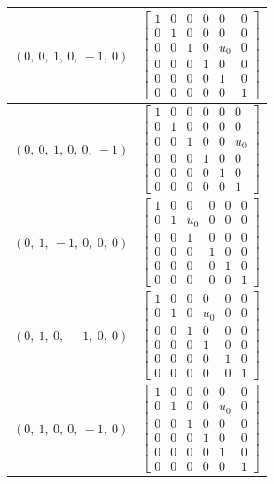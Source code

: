 \documentclass[11pt]{article}
\theoremstyle{definition}
\begin{document}
\begin{longtable}{|l|c|}
    \hline
    $\left( 0, \  0, \  1, \  0, \  -1, \  0\right)$ & ${\left[\begin{matrix}1 & 0 & 0 & 0 & 0 & 0\\0 & 1 & 0 & 0 & 0 & 0\\0 & 0 & 1 & 0 & u_{0} & 0\\0 & 0 & 0 & 1 & 0 & 0\\0 & 0 & 0 & 0 & 1 & 0\\0 & 0 & 0 & 0 & 0 & 1\end{matrix}\right]}$ \\
    \hline
    $\left( 0, \  0, \  1, \  0, \  0, \  -1\right)$ & ${\left[\begin{matrix}1 & 0 & 0 & 0 & 0 & 0\\0 & 1 & 0 & 0 & 0 & 0\\0 & 0 & 1 & 0 & 0 & u_{0}\\0 & 0 & 0 & 1 & 0 & 0\\0 & 0 & 0 & 0 & 1 & 0\\0 & 0 & 0 & 0 & 0 & 1\end{matrix}\right]}$ \\
    \hline
    $\left( 0, \  1, \  -1, \  0, \  0, \  0\right)$ & ${\left[\begin{matrix}1 & 0 & 0 & 0 & 0 & 0\\0 & 1 & u_{0} & 0 & 0 & 0\\0 & 0 & 1 & 0 & 0 & 0\\0 & 0 & 0 & 1 & 0 & 0\\0 & 0 & 0 & 0 & 1 & 0\\0 & 0 & 0 & 0 & 0 & 1\end{matrix}\right]}$ \\
    \hline
    $\left( 0, \  1, \  0, \  -1, \  0, \  0\right)$ & ${\left[\begin{matrix}1 & 0 & 0 & 0 & 0 & 0\\0 & 1 & 0 & u_{0} & 0 & 0\\0 & 0 & 1 & 0 & 0 & 0\\0 & 0 & 0 & 1 & 0 & 0\\0 & 0 & 0 & 0 & 1 & 0\\0 & 0 & 0 & 0 & 0 & 1\end{matrix}\right]}$ \\
    \hline
    $\left( 0, \  1, \  0, \  0, \  -1, \  0\right)$ & ${\left[\begin{matrix}1 & 0 & 0 & 0 & 0 & 0\\0 & 1 & 0 & 0 & u_{0} & 0\\0 & 0 & 1 & 0 & 0 & 0\\0 & 0 & 0 & 1 & 0 & 0\\0 & 0 & 0 & 0 & 1 & 0\\0 & 0 & 0 & 0 & 0 & 1\end{matrix}\right]}$ \\

\end{longtable}
\end{document}
